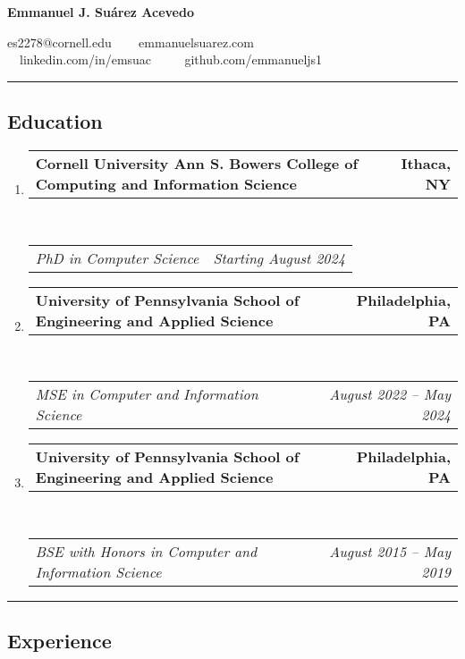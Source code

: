 \documentclass[letterpaper]{article}
\makeatletter
\newif\iflong
\newcommand{\headerrow}[2]
{\begin{tabular*}{\linewidth}{l@{\extracolsep{\fill}}r}
	#1 &
	#2 \\
\end{tabular*}}
\makeatother
\begin{document}
\begin{center}
{\LARGE \textbf{Emmanuel J. Suárez Acevedo}}

es2278@cornell.edu \ \textbullet
\ \ emmanuelsuarez.com \\

\ \ linkedin.com/in/emsuac \ \ \textbullet
\ \ github.com/emmanueljs1\\
\end{center}
\hrule

\iflong
\subsection*{Research Interests}
\begin{enumerate}[label=]
       \parskip=-0.25em

    \item Programming language theory, type theory, proof assistants
\end{enumerate}
\hrule
\fi

\subsection*{Education}
  
\begin{enumerate}[label=]
	\parskip=-0.05em
	\item
	\headerrow
        {\textbf{Cornell University Ann S. Bowers College of Computing and Information Science}}
		{\textbf{Ithaca, NY}}
	\\
	\headerrow
		{\emph{PhD in Computer Science}}
        {\emph{Starting August 2024}}

	\item 
	\headerrow
		{\textbf{University of Pennsylvania School of Engineering and Applied Science}}
		{\textbf{Philadelphia, PA}}
	\\
	\headerrow
		{\emph{MSE in Computer and Information Science}}
		{\emph{August 2022 -- May 2024}}

	\item 
	\headerrow
		{\textbf{University of Pennsylvania School of Engineering and Applied Science}}
		{\textbf{Philadelphia, PA}}
	\\
	\headerrow
		{\emph{BSE with Honors in Computer and Information Science}}
		{\emph{August 2015 -- May 2019}}

\end{enumerate}

\hrule
\subsection*{Experience}
\end{document}
